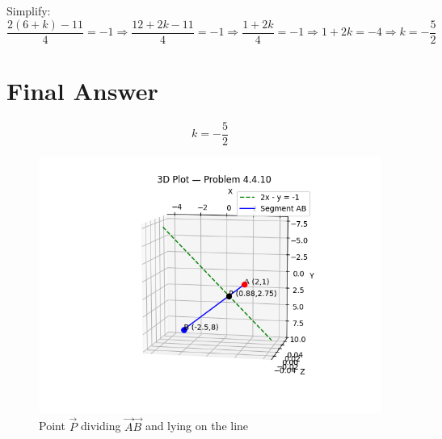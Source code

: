 \documentclass[journal]{IEEEtran}
\begin{document}
Simplify:
\[
\frac{2(6 + k) - 11}{4} = -1
\Rightarrow \frac{12 + 2k - 11}{4} = -1
\Rightarrow \frac{1 + 2k}{4} = -1
\Rightarrow 1 + 2k = -4
\Rightarrow k = -\frac{5}{2}
\]

\section*{\large\textbf{Final Answer}}

\begin{equation}
\boxed{k = -\frac{5}{2}}
\end{equation}

\begin{figure}[H]
\centering
\includegraphics[width=01.1\linewidth]{Figs/Fig1.png}
\caption{Point \( \vec{P} \) dividing \( \vec{A}\vec{B} \) and lying on the line}
\end{figure}
\end{document}
